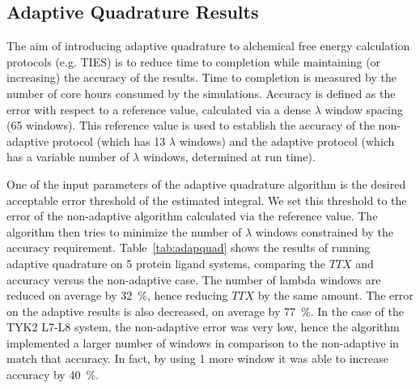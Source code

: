 \subsection{Adaptive Quadrature Results}

 

The aim of introducing adaptive quadrature to alchemical free energy 
calculation protocols (e.g. TIES) is to reduce time to completion while 
maintaining (or increasing) the accuracy of the results. Time to completion is 
measured by the number of core hours consumed by the simulations. Accuracy is 
defined as the error with respect to a reference value, calculated via a dense 
$\lambda$ window spacing (65 windows). This reference value is used to establish 
the accuracy of the non-adaptive protocol (which has 13 $\lambda$ windows) and 
the adaptive protocol (which has a variable number of $\lambda$ windows, 
determined at run time).

One of the input parameters of the adaptive quadrature algorithm is the desired 
acceptable error threshold of the estimated integral. We set this 
threshold to the error of the non-adaptive algorithm calculated via the 
reference value. The algorithm then tries to minimize the number of $\lambda$ 
windows constrained by the accuracy requirement. Table~\ref{tab:adapquad} shows 
the results of running adaptive quadrature on 5 protein ligand systems, 
comparing the \(TTX\) and accuracy versus the non-adaptive case. The 
number of lambda windows are reduced on average by \SI{32}{\percent}, hence 
reducing \(TTX\) by the same amount. The error on the adaptive 
results is also decreased, on average by \SI{77}{\percent}. In the case of the 
TYK2 L7-L8 system, the non-adaptive error was very low, hence the algorithm 
implemented a larger number of windows in comparison to the non-adaptive in 
match that accuracy. In fact, by using 1 more window it was able to increase 
accuracy by \SI{40}{\percent}. 

